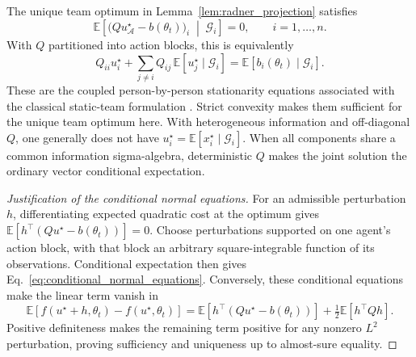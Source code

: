 \begin{corollary}
\label{cor:conditional_normal_equations}
The unique team optimum in Lemma~\ref{lem:radner_projection} satisfies
\begin{equation}
    \boxed{
    \mathbb E\!\left[
      \bigl(Q u_{\mathcal A}^{\star}-b(\theta_t)\bigr)_i
      \;\middle|\;
      \mathcal G_i
    \right]
    =0,
    \qquad i=1,\ldots,n.
    }
    \label{eq:conditional_normal_equations}
\end{equation}
With $Q$ partitioned into action blocks, this is equivalently
\begin{equation}
Q_{ii}u_i^\star
+
\sum_{j\ne i}Q_{ij}\,
\mathbb E[u_j^\star\mid\mathcal G_i]
=
\mathbb E[b_i(\theta_t)\mid\mathcal G_i].
\label{eq:block_conditional_normal_equations}
\end{equation}
These are the coupled person-by-person stationarity equations associated with
the classical static-team formulation \cite{radner1962team}. Strict convexity
makes them sufficient for the unique team optimum here. With heterogeneous
information and
off-diagonal $Q$, one generally does not have
$u_i^\star=\mathbb E[x_i^\star\mid\mathcal G_i]$. When all components share a
common information sigma-algebra, deterministic $Q$ makes the joint solution
the ordinary vector conditional expectation.
\end{corollary}


\begin{proof}[Justification of the conditional normal equations]
For an admissible perturbation $h$, differentiating expected quadratic cost
at the optimum gives $\mathbb E[h^\top(Qu^\star-b(\theta_t))]=0$.
Choose perturbations supported on one agent's action block, with that block
an arbitrary square-integrable function of its observations. Conditional
expectation then gives Eq.~\eqref{eq:conditional_normal_equations}.
Conversely, these conditional equations make the linear term vanish in
\[
\mathbb E[f(u^\star+h,\theta_t)-f(u^\star,\theta_t)]
=\mathbb E[h^\top(Qu^\star-b(\theta_t))]+\tfrac12\mathbb E[h^\top Qh].
\]
Positive definiteness makes the remaining term positive for any nonzero
$L^2$ perturbation, proving sufficiency and uniqueness up to almost-sure equality.
\end{proof}
